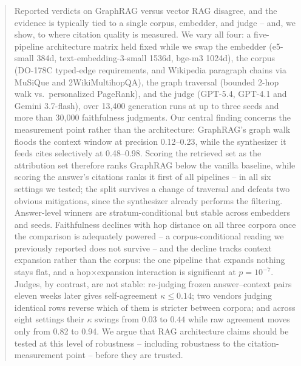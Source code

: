 \begin{abstract}
Reported verdicts on GraphRAG versus vector RAG disagree, and the
evidence is typically tied to a single corpus, embedder, and judge --
and, we show, to where citation quality is measured. We vary all four:
a five-pipeline architecture matrix held fixed while we swap the
embedder (e5-small 384d, text-embedding-3-small 1536d, bge-m3 1024d),
the corpus (DO-178C typed-edge requirements, and Wikipedia paragraph
chains via MuSiQue and 2WikiMultihopQA), the graph traversal (bounded
2-hop walk vs.\ personalized PageRank), and the judge (GPT-5.4, GPT-4.1
and Gemini 3.7-flash), over 13{,}400 generation runs at up to three
seeds and more than 30{,}000 faithfulness judgments. Our central finding concerns
the measurement point rather than the architecture: GraphRAG's graph
walk floods the context window at precision 0.12--0.23, while the
synthesizer it feeds cites selectively at 0.48--0.98. Scoring the
retrieved set as the attribution set therefore ranks GraphRAG below the
vanilla baseline, while scoring the answer's citations ranks it first of
all pipelines -- in all six settings we tested; the split survives a change of traversal and defeats
two obvious mitigations, since the synthesizer already performs the
filtering. Answer-level winners are stratum-conditional but stable
across embedders and seeds. Faithfulness declines with hop distance on all
three corpora once the comparison is adequately powered -- a
corpus-conditional reading we previously reported does not survive --
and the decline tracks context expansion rather than the corpus: the one
pipeline that expands nothing stays flat, and a hop$\times$expansion
interaction is significant at $p{=}10^{-7}$. Judges,
by contrast, are not stable: re-judging frozen answer--context pairs
eleven weeks later gives self-agreement $\kappa{\leq}0.14$; two vendors
judging identical rows reverse which of them is stricter between
corpora; and across eight settings their $\kappa$ swings from $0.03$ to
$0.44$ while raw agreement moves only from 0.82 to 0.94. We argue that RAG
architecture claims should be tested at this level of robustness --
including robustness to the citation-measurement point -- before they
are trusted.
\end{abstract}

